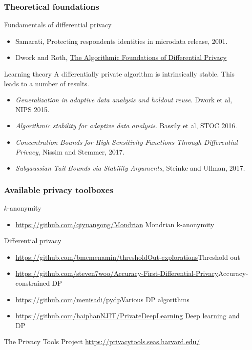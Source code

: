 \begin{frame}
  \frametitle{Theoretical foundations}
  
  \begin{block}{Fundamentals of differential privacy}
    \begin{itemize}
    \item Samarati, Protecting respondents identities in microdata release, 2001.
    \item Dwork and Roth, \href{https://www.cis.upenn.edu/~aaroth/Papers/privacybook.pdf}{The Algorithmic Foundations of Differential Privacy}
    \end{itemize}
  \end{block}
  \begin{block}{Learning theory}
    A differentially private algorithm is intrinsically \alert{stable}. This leads to a number of results.
    \begin{itemize}
    \item \emph{Generalization in adaptive data analysis and holdout reuse}. Dwork et al, NIPS 2015.
    \item \emph{Algorithmic stability for adaptive data analysis}. Bassily et al, STOC 2016.
    \item \emph{Concentration Bounds for High Sensitivity Functions Through Differential Privacy}, Nissim and Stemmer, 2017.
    \item \emph{ Subgaussian Tail Bounds via Stability Arguments}, Steinke and Ullman, 2017.
    \end{itemize}
  \end{block}
\end{frame}

\begin{frame}
  \frametitle{Available privacy toolboxes}
  \begin{block}{$k$-anonymity}
    \begin{itemize}
    \item \url{https://github.com/qiyuangong/Mondrian} Mondrian k-anonymity
    \end{itemize}
  \end{block}
  \begin{block}{Differential privacy}
    \begin{itemize}
    \item \url{https://github.com/bmcmenamin/thresholdOut-explorations}{Threshold out}
    \item \url{https://github.com/steven7woo/Accuracy-First-Differential-Privacy}{Accuracy-constrained DP}
    \item \url{https://github.com/menisadi/pydp}{Various DP algorithms}
    \item \url{https://github.com/haiphanNJIT/PrivateDeepLearning} Deep learning and DP
    \end{itemize}
  \end{block}
  The Privacy Tools Project \url{https://privacytools.seas.harvard.edu/}
\end{frame}





